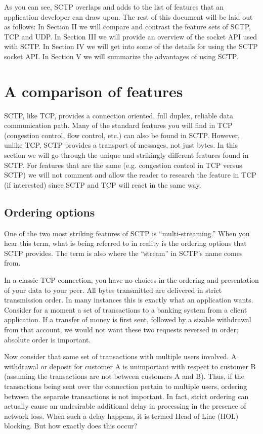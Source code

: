 \documentclass[conference]{IEEEtran}
\begin{document}
As you can see, SCTP overlaps and adds to the list
of features that an application developer can draw upon.  The rest of this document will be laid
out as follows: In Section II we will compare and contrast the feature sets of SCTP, TCP and UDP.
In Section III we will provide an overview of the socket API used with SCTP. In Section IV we will
get into some of the details for using the SCTP socket API. In Section V we will summarize the
advantages of using SCTP.

\section{A comparison of features}
SCTP, like TCP, provides a connection oriented, full duplex, reliable data communication path. 
Many of the standard features you will find in TCP (congestion control, flow control, etc.)
can also be found in SCTP. However, unlike TCP, SCTP provides a transport of messages, not just
bytes. In this section we will go through the unique and strikingly different
features found in SCTP. For features that are the same (e.g. congestion control in TCP versus
SCTP) we will not comment and allow the reader to research the feature
in TCP (if interested) since SCTP and TCP will react in the same way.

\subsection{Ordering options}
\label{hol}
One of the two most striking features of SCTP is ``multi-streaming.'' When you hear
this term, what is being referred to in reality is the ordering options that SCTP provides.
The term is also where the ``stream'' in SCTP's name comes from.

In a classic TCP connection, you have no choices in the ordering and presentation of your
data to your peer. All bytes transmitted are delivered in strict transmission order. In many
instances this is exactly what an application wants. Consider for a moment a set of
transactions to a banking system from a client application. If a transfer of
money is first sent, followed by a sizable withdrawal from that account, we would not want
these two requests reversed in order; absolute order is important. 

Now consider that same set of transactions with multiple users involved. A withdrawal or
deposit for customer A is unimportant with respect to customer B (assuming the transactions
are not between customers A and B).  Thus, if the transactions
being sent over the connection pertain to multiple users, ordering between the
separate transactions is not important. In fact, strict ordering can actually cause
an undesirable additional delay in processing in the presence of network loss.
When such a delay happens, it is termed Head of Line (HOL) blocking.
But how exactly does this occur?
\end{document}
